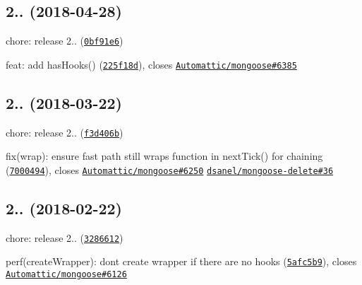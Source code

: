 \label{_2.0.7}%
 \subsection*{
\footnotesize 2.. (2018-\/04-\/28)
\normalsize }


\begin{DoxyItemize}
\item chore\+: release 2.. (\href{https://github.com/vkarpov15/kareem/commit/0bf91e6}{\tt 0bf91e6})
\item feat\+: add {\ttfamily has\+Hooks()} (\href{https://github.com/vkarpov15/kareem/commit/225f18d}{\tt 225f18d}), closes \href{https://github.com/Automattic/mongoose/issues/6385}{\tt Automattic/mongoose\#6385}
\end{DoxyItemize}

\label{_2.0.6}%
 \subsection*{
\footnotesize 2.. (2018-\/03-\/22)
\normalsize }


\begin{DoxyItemize}
\item chore\+: release 2.. (\href{https://github.com/vkarpov15/kareem/commit/f3d406b}{\tt f3d406b})
\item fix(wrap)\+: ensure fast path still wraps function in {\ttfamily next\+Tick()} for chaining (\href{https://github.com/vkarpov15/kareem/commit/7000494}{\tt 7000494}), closes \href{https://github.com/Automattic/mongoose/issues/6250}{\tt Automattic/mongoose\#6250} \href{https://github.com/dsanel/mongoose-delete/issues/36}{\tt dsanel/mongoose-\/delete\#36}
\end{DoxyItemize}

\label{_2.0.5}%
 \subsection*{
\footnotesize 2.. (2018-\/02-\/22)
\normalsize }


\begin{DoxyItemize}
\item chore\+: release 2.. (\href{https://github.com/vkarpov15/kareem/commit/3286612}{\tt 3286612})
\item perf(create\+Wrapper)\+: don\textquotesingle{}t create wrapper if there are no hooks (\href{https://github.com/vkarpov15/kareem/commit/5afc5b9}{\tt 5afc5b9}), closes \href{https://github.com/Automattic/mongoose/issues/6126}{\tt Automattic/mongoose\#6126}
\end{DoxyItemize}

